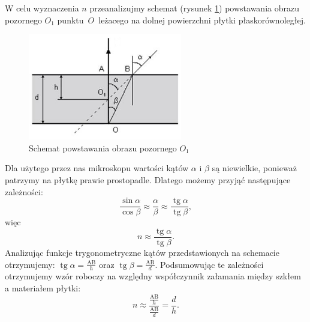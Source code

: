 \documentclass [a4paper,11pt]{article}
\DeclareMathOperator{\tg}{tg}
\begin{document}
	W celu wyznaczenia $n$ przeanalizujmy schemat (rysunek \ref{fig:schemat}) powstawania obrazu pozornego $O_1$ punktu~$O$~leżacego na dolnej powierzchni płytki płaskorównoległej. 
	\begin{center}
	
			\begin{figure}[!h]
				\centering
				\includegraphics[width=0.6\textwidth]{schemat_zalamanie}
				\caption{Schemat powstawania obrazu pozornego $O_1$ }
				\label{fig:schemat}
		\end{figure}
	\end{center}
	
	Dla użytego przez nas mikroskopu wartości kątów $\alpha$ i $\beta$ są niewielkie, ponieważ patrzymy na płytkę prawie prostopadle. Dlatego możemy przyjąć następujące zależności:
	\begin{equation}
		\frac{\sin \alpha}{\cos \beta}\approx\frac{ \alpha}{ \beta}\approx\frac{\tg \alpha}{\tg \beta},
	\end{equation}
	więc
	\begin{equation}
		n\approx\frac{\tg \alpha}{\tg \beta}.
	\end{equation}
	Analizując funkcje trygonometryczne kątów przedstawionych na schemacie otrzymujemy:
	$\tg \alpha = \frac{\text{AB}}{h}$ oraz $\tg \beta = \frac{\text{AB}}{d}$.
	Podsumowując te zależności otrzymujemy wzór roboczy na względny współczynnik załamania między szkłem a materiałem płytki:
	\begin{equation}
	\label{eq:roboczy}
		n\approx\frac{\frac{\text{AB}}{h}}{\frac{\text{AB}}{d}}=\frac{d}{h}.
	\end{equation} 
	
	  	
		
\end{document}
